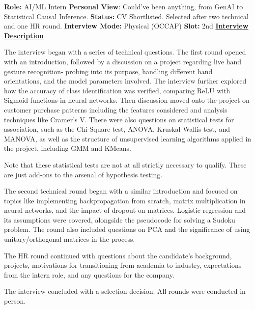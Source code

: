 \documentclass[12pt]{article}
\begin{document}
\textbf{Role:} AI/ML Intern
\newline
\textbf{Personal View}: Could've been anything, from GenAI to Statistical Causal Inference.
\newline
\textbf{Status:} CV Shortlisted. Selected after two technical and one HR round.
\newline
\textbf{Interview Mode:} Physical (OCCAP)
\newline
\textbf{Slot:} 2nd
\newline
\vspace{10pt}
\newline
\underline{\textbf{Interview Description}}
\newline

The interview began with a series of technical questions. The first round opened with an introduction, followed by a discussion on a project regarding live hand gesture recognition-  probing into its purpose, handling different hand orientations, and the model parameters involved. The interview further explored how the accuracy of class identification was verified, comparing ReLU with Sigmoid functions in neural networks. 
Then discussion moved onto the project on customer purchase patterns including the features considered and analysis techniques like Cramer's V. There were also questions on statistical tests for association, such as the Chi-Square test, ANOVA, Kruskal-Wallis test, and MANOVA, as well as the structure of unsupervised learning algorithms applied in the project, including GMM and KMeans.

Note that these statistical tests are not at all strictly necessary to qualify. These are just add-ons to the arsenal of hypothesis testing.

The second technical round began with a similar introduction and focused on topics like implementing backpropagation from scratch, matrix multiplication in neural networks, and the impact of dropout on matrices. Logistic regression and its assumptions were covered, alongside the pseudocode for solving a Sudoku problem. The round also included questions on PCA and the significance of using unitary/orthogonal matrices in the process.

The HR round continued with questions about the candidate's background, projects, motivations for transitioning from academia to industry, expectations from the intern role, and any questions for the company. 

The interview concluded with a selection decision. All rounds were conducted in person.
\end{document}
